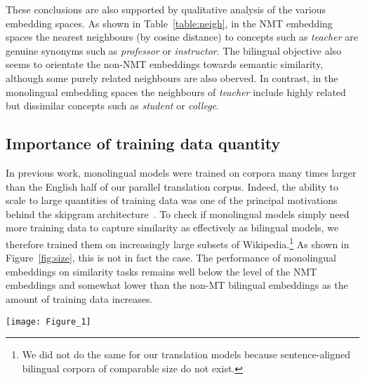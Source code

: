 \documentclass{article} %
\begin{document}
These conclusions are also supported by qualitative analysis of the various embedding spaces. As shown in Table~\ref{table:neigh}, in the NMT embedding spaces the nearest neighbours (by cosine distance) to concepts such as \emph{teacher} are genuine synonyms such as \emph{professor} or \emph{instructor}. The bilingual objective also seems to orientate the non-NMT embeddings towards semantic similarity, although some purely related neighbours are also oberved. In contrast, in the monolingual embedding spaces the neighbours of \emph{teacher} include  highly related but dissimilar concepts such as \emph{student} or \emph{college}. 

 
\subsection{Importance of training data quantity}

In previous work, monolingual models were trained on corpora many times larger than the English half of our parallel translation corpus. Indeed, the ability to scale to large quantities of training data was one of the principal motivations behind the skipgram architecture~\citep{mikolov2013distributed}. To check if monolingual models simply need more training data to capture similarity as effectively as bilingual models, we therefore trained them on increasingly large subsets of Wikipedia.\footnote{We did not do the same for our translation models because sentence-aligned bilingual corpora of comparable size do not exist.} As shown in Figure~\ref{fig:size}, this is not in fact the case. The performance of monolingual embeddings on similarity tasks remains well below the level of the NMT embeddings and somewhat lower than the non-MT bilingual embeddings as the amount of training data increases. 

\begin{figure*}[h]
\texttt{[image: Figure\_1]}
\vspace{-4mm}
\caption{The effect of increasing the amount of training data on the quality of monolingual embeddings, based on similarity-based evaluations (SimLex-999) and two relatedness-based evaluations (MEN and WordSim-353). \emph{ET} in the legend indicates models trained on the English half of the translation corpus. \emph{Wiki} indicates models trained on Wikipedia.}
\label{fig:size}
\end{figure*}
\end{document}
